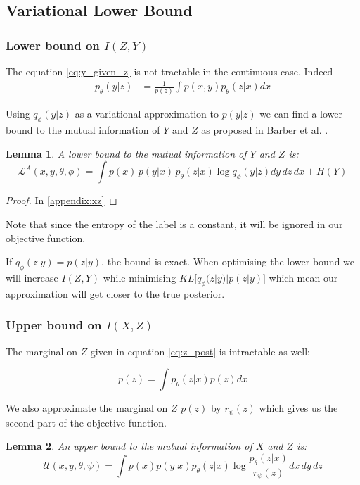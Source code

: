 \documentclass[11pt,oneside,openright]{report}
\newtheorem{lemma}{Lemma}
\begin{document}
\subsection{Variational Lower Bound}

\subsubsection{Lower bound on $I(Z, Y)$}
The equation \ref{eq:y_given_z} is not tractable in the continuous case. Indeed
\begin{align}
p_\theta(y|z) &= \frac{1}{p(z)} \int p(x, y) p_\theta(z|x) dx
\end{align}

Using $q_\phi(y|z)$ as a variational approximation to $p(y|z)$ we can find a lower bound to the mutual information of $Y$ and $Z$ as proposed in Barber et al. \cite{barber}.

\begin{lemma}
A lower bound to the mutual information of $Y$ and $Z$ is:
$$ \mathcal{L}^{A}(x, y, \theta, \phi) = \int p(x)\, p(y|x)\, p_\theta(z|x) \log q_\phi(y|z) dy\, dz\, dx + H(Y)$$
\end{lemma}

\begin{proof} In \ref{appendix:xz}\end{proof}
Note that since the entropy of the label is a constant, it will be ignored in our objective function.

If $q_\phi(z|y) = p(z|y)$, the bound is exact. When optimising the lower bound we will increase $I(Z, Y)$ while minimising $KL\big[q_\phi(z|y)|p(z|y)\big]$ which mean our approximation will get closer to the true posterior.

\subsubsection{Upper bound on $I(X, Z)$}
The marginal on $Z$ given in equation \ref{eq:z_post} is intractable as well:

$$ p(z) = \int p_\theta(z|x) p(z) dx $$

We also approximate the marginal on $Z$ $p(z)$ by $r_\psi(z)$ which gives us the second part of the objective function. 

\begin{lemma}
An upper bound to the mutual information of $X$ and $Z$ is:
$$ \mathcal{U}(x, y, \theta, \psi) = \int p(x)p(y|x)p_\theta(z|x) \log \frac{p_\theta(z|x)}{r_\psi(z)}dx\, dy\, dz$$
\end{lemma}
\end{document}

